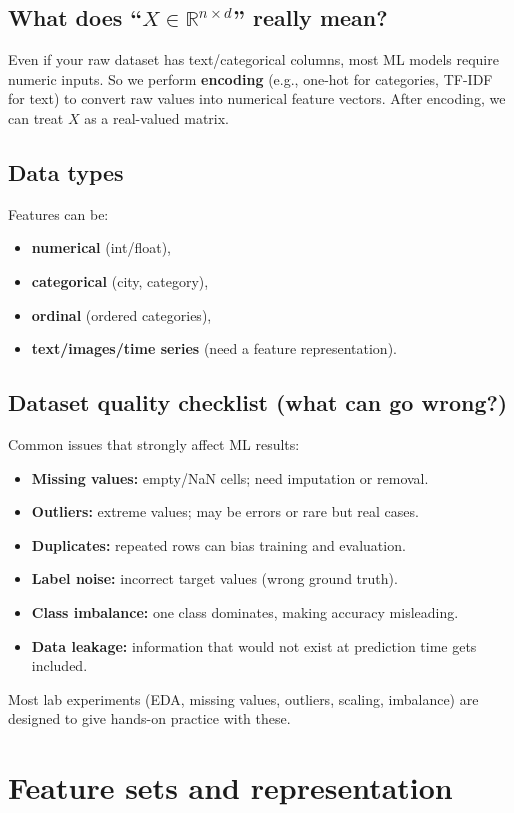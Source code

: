 \documentclass[11pt]{article}
\begin{document}
\subsection{What does ``$X \in \mathbb{R}^{n \times d}$'' really mean?}
Even if your raw dataset has text/categorical columns, most ML models require numeric inputs.
So we perform \textbf{encoding} (e.g., one-hot for categories, TF-IDF for text) to convert raw values into numerical feature vectors.
After encoding, we can treat $X$ as a real-valued matrix.

\subsection{Data types}
Features can be:
\begin{itemize}[leftmargin=*]
  \item \textbf{numerical} (int/float),
  \item \textbf{categorical} (city, category),
  \item \textbf{ordinal} (ordered categories),
  \item \textbf{text/images/time series} (need a feature representation).
\end{itemize}

\subsection{Dataset quality checklist (what can go wrong?)}
Common issues that strongly affect ML results:
\begin{itemize}[leftmargin=*]
  \item \textbf{Missing values:} empty/NaN cells; need imputation or removal.
  \item \textbf{Outliers:} extreme values; may be errors or rare but real cases.
  \item \textbf{Duplicates:} repeated rows can bias training and evaluation.
  \item \textbf{Label noise:} incorrect target values (wrong ground truth).
  \item \textbf{Class imbalance:} one class dominates, making accuracy misleading.
  \item \textbf{Data leakage:} information that would not exist at prediction time gets included.
\end{itemize}
Most lab experiments (EDA, missing values, outliers, scaling, imbalance) are designed to give hands-on practice with these.

\section{Feature sets and representation}
\end{document}
